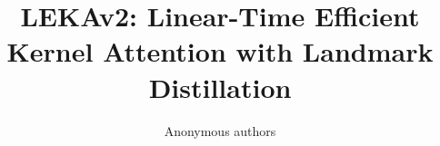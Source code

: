 \title{\textbf{LEKAv2: Linear-Time Efficient Kernel Attention with Landmark Distillation}}

\author{Anonymous authors}
